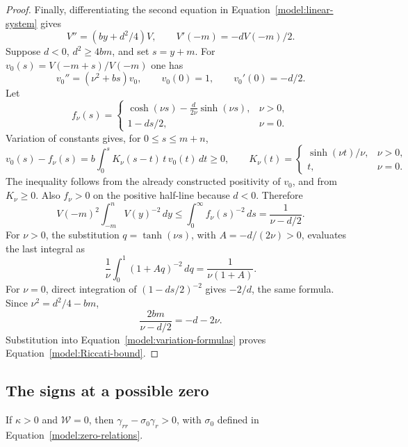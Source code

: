 \begin{proof}
Finally, differentiating the second equation in
Equation~\eqref{model:linear-system} gives
\[
 V''=(by+d^2/4)V,\qquad V'(-m)=-dV(-m)/2.
\]
Suppose \(d<0\), \(d^2\ge4bm\), and set \(s=y+m\).
For \(v_0(s)=V(-m+s)/V(-m)\) one has
\[
 v_0''=(\nu^2+bs)v_0,\qquad v_0(0)=1,\qquad v_0'(0)=-d/2.
\]
Let
\[
 f_\nu(s)=
 \begin{cases}
 \displaystyle\cosh(\nu s)-\frac d{2\nu}\sinh(\nu s),&\nu>0,\\[1mm]
 1-ds/2,&\nu=0.
 \end{cases}
\]
Variation of constants gives, for \(0\le s\le m+n\),
\[
 v_0(s)-f_\nu(s)
 =b\int_0^s K_\nu(s-t)\,t\,v_0(t)\,dt\ge0,
 \qquad
 K_\nu(t)=
 \begin{cases}\sinh(\nu t)/\nu,&\nu>0,\\t,&\nu=0.\end{cases}
\]
The inequality follows from the already constructed positivity of
\(v_0\), and from \(K_\nu\ge0\).  Also \(f_\nu>0\) on the positive
half-line because \(d<0\).  Therefore
\begin{equation}
 V(-m)^2\int_{-m}^{n}V(y)^{-2}\,dy
 \le\int_0^\infty f_\nu(s)^{-2}\,ds
 =\frac1{\nu-d/2}.
 \label{model:inverse-square-bound}
\end{equation}
For \(\nu>0\), the substitution \(q=\tanh(\nu s)\), with
\(A=-d/(2\nu)>0\), evaluates the last integral as
\[
 \frac1\nu\int_0^1(1+Aq)^{-2}\,dq
 =\frac1{\nu(1+A)}.
\]
For \(\nu=0\), direct integration of \((1-ds/2)^{-2}\) gives
\(-2/d\), the same formula.
Since \(\nu^2=d^2/4-bm\),
\[
 \frac{2bm}{\nu-d/2}=-d-2\nu.
\]
Substitution into Equation~\eqref{model:variation-formulas} proves
Equation~\eqref{model:Riccati-bound}.
\end{proof}

\subsection{The signs at a possible zero}

\begin{lemma}
\label{model:zero-sign}
If \(\kappa>0\) and \(\mathcal W=0\), then
\(\gamma_{rr}-\sigma_0\gamma_r>0\), with \(\sigma_0\) defined in
Equation~\eqref{model:zero-relations}.
\end{lemma}

